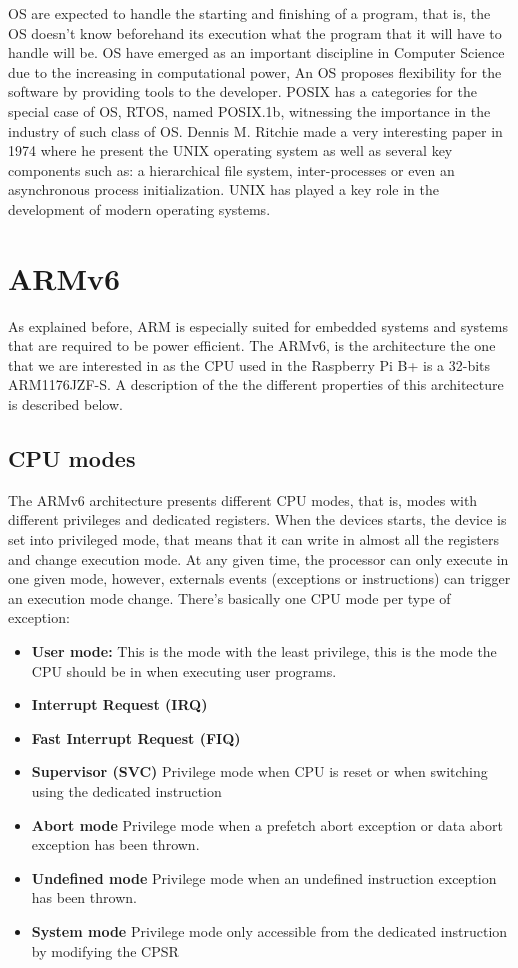OS are expected to handle the starting and finishing of a program, that is, the OS doesn't know beforehand its execution what the program that it will have to handle will be.
OS have emerged as an important discipline in Computer Science due to the increasing in computational power, An OS proposes flexibility for the software by providing tools to the developer. POSIX has a categories for the special case of OS, RTOS, named POSIX.1b, witnessing the importance in the industry of such class of OS. Dennis M. Ritchie made a very interesting paper\cite{ritchie_UNIX} in 1974 where he present the UNIX operating system as well as several key components such as: a hierarchical file system, inter-processes or even an asynchronous process initialization. UNIX has played a key role in the development of modern operating systems.


\section{ARMv6} \label{chapter2_armv6}
As explained before, ARM is especially suited for embedded systems and systems that are required to be power efficient. The ARMv6, is the architecture the one that we are interested in as the CPU used in the Raspberry Pi B+ is a 32-bits ARM1176JZF-S. A description of the the different properties of this architecture is described below.

\subsection{CPU modes}
The ARMv6 architecture presents different CPU modes, that is, modes with different privileges and dedicated registers. When the devices starts, the device is set into privileged mode, that means that it can write in almost all the registers and change execution mode. At any given time, the processor can only execute in one given mode, however, externals events (exceptions or instructions) can trigger an execution mode change. There's basically one CPU mode per type of exception:

\begin{itemize}
\item\textbf{User mode:} This is the mode with the least privilege, this is the mode the CPU should be in when executing user programs.
\item\textbf{Interrupt Request (IRQ)}
\item\textbf{Fast Interrupt Request (FIQ)}
\item\textbf{Supervisor (SVC)} Privilege mode when CPU is reset or when switching using the dedicated instruction
\item\textbf{Abort mode} Privilege mode when a prefetch abort exception or data abort exception has been thrown.
\item\textbf{Undefined mode} Privilege mode when an undefined instruction exception has been thrown.
\item\textbf{System mode} Privilege mode only accessible from the dedicated instruction by modifying the CPSR
\end{itemize}



